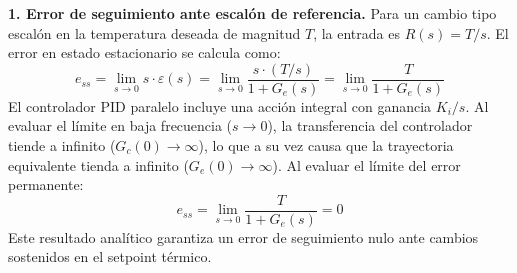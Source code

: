 \documentclass[journal,twocolumn]{IEEEtran}
\begin{document}
\textbf{1. Error de seguimiento ante escalón de referencia.}
Para un cambio tipo escalón en la temperatura deseada de magnitud $T$, la entrada es $R(s) = T/s$. El error en estado estacionario se calcula como:
\begin{equation}
    e_{ss} = \lim_{s \to 0} s \cdot \varepsilon(s) = \lim_{s \to 0} \frac{s \cdot (T/s)}{1 + G_e(s)} = \lim_{s \to 0} \frac{T}{1 + G_e(s)}
\end{equation}
El controlador PID paralelo incluye una acción integral con ganancia $K_i/s$. Al evaluar el límite en baja frecuencia ($s \to 0$), la transferencia del controlador tiende a infinito ($G_c(0) \to \infty$), lo que a su vez causa que la trayectoria equivalente tienda a infinito ($G_e(0) \to \infty$). Al evaluar el límite del error permanente:
\begin{equation}
    e_{ss} = \lim_{s \to 0} \frac{T}{1 + G_e(s)} = 0
\end{equation}
Este resultado analítico garantiza un error de seguimiento nulo ante cambios sostenidos en el setpoint térmico.
\end{document}
